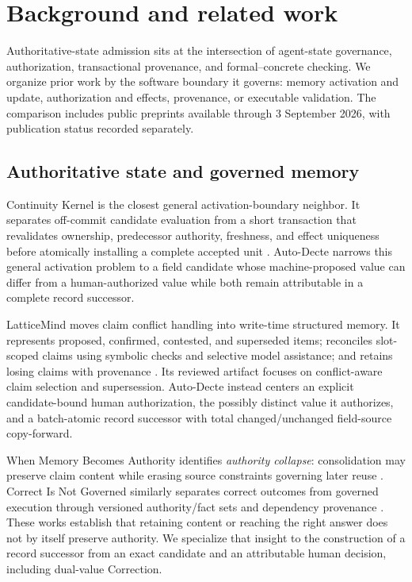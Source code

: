 \section{Background and related work}
\label{sec:related}

Authoritative-state admission sits at the intersection of agent-state governance, authorization, transactional provenance, and formal--concrete checking. We organize prior work by the software boundary it governs: memory activation and update, authorization and effects, provenance, or executable validation. The comparison includes public preprints available through 3 September 2026, with publication status recorded separately.

\subsection{Authoritative state and governed memory}

Continuity Kernel is the closest general activation-boundary neighbor. It separates off-commit candidate evaluation from a short transaction that revalidates ownership, predecessor authority, freshness, and effect uniqueness before atomically installing a complete accepted unit \citep{he2026continuity}. Auto-Decte narrows this general activation problem to a field candidate whose machine-proposed value can differ from a human-authorized value while both remain attributable in a complete record successor.

LatticeMind moves claim conflict handling into write-time structured memory. It represents proposed, confirmed, contested, and superseded items; reconciles slot-scoped claims using symbolic checks and selective model assistance; and retains losing claims with provenance \citep{zhou2026latticemind}. Its reviewed artifact focuses on conflict-aware claim selection and supersession. Auto-Decte instead centers an explicit candidate-bound human authorization, the possibly distinct value it authorizes, and a batch-atomic record successor with total changed/unchanged field-source copy-forward.

When Memory Becomes Authority identifies \emph{authority collapse}: consolidation may preserve claim content while erasing source constraints governing later reuse \citep{zhan2026authoritycollapse}. Correct Is Not Governed similarly separates correct outcomes from governed execution through versioned authority/fact sets and dependency provenance \citep{salas2026governed}. These works establish that retaining content or reaching the right answer does not by itself preserve authority. We specialize that insight to the construction of a record successor from an exact candidate and an attributable human decision, including dual-value Correction.

